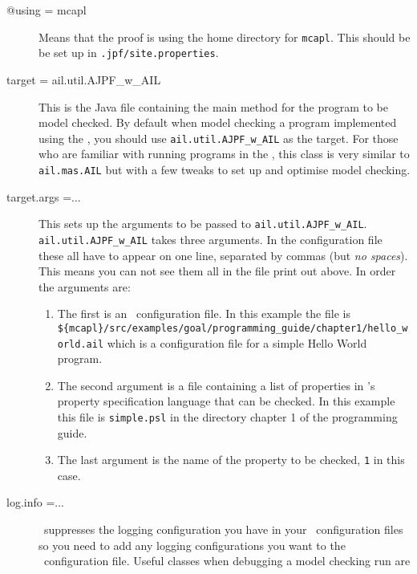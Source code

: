 \documentclass[a4]{article}
\begin{document}
{{\begin{sloppypar}
\begin{description}
\item[@using = mcapl] Means that the proof is using the home directory for \texttt{mcapl}.  This should be be set up in \texttt{.jpf/site.properties}.
\item[target = ail.util.AJPF\_w\_AIL] This is the Java file containing the main method for the program to be model checked.  By default when model checking a program implemented using the \ail, you should use \texttt{ail.util.AJPF\_w\_AIL} as the target.  For those who are familiar with running programs in the \ail, this class is very similar to \texttt{ail.mas.AIL} but with a few tweaks to set up and optimise model checking.
\item[target.args =...] This sets up the arguments to be passed to \texttt{ail.util.AJPF\_w\_AIL}.  \texttt{ail.util.AJPF\_w\_AIL} takes three arguments.  In the configuration file these all have to appear on one line, separated by commas (but \emph{no spaces}).  This means you can not see them all in the file print out above.  In order the arguments are:
\begin{enumerate}
\item The first is an \ail\ configuration file.  In this example the file is \texttt{\$\{mcapl\}/src/examples/goal/programming_guide/chapter1/hello\_world.ail} which is a configuration file for a simple Hello World program.
\item The second argument is a file containing a list of properties in \ajpf's property specification language that can be checked.  In this example this file is \texttt{simple.psl} in the directory chapter 1 of the programming guide.
\item The last argument is the name of the property to be checked, \texttt{1} in this case.
\end{enumerate}
\item[log.info =... ] \jpf\ suppresses the logging configuration you have in your \ail\ configuration files so you need to add any logging configurations you want to the \jpf\ configuration file.  Useful classes when debugging a model checking run are


\end{description}
\end{sloppypar}}}
\end{document}
